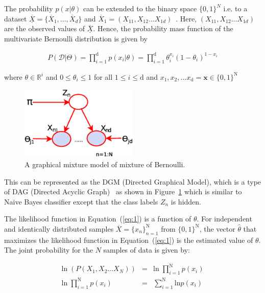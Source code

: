 The probability $p(x|\theta)$ can be extended to the binary space $\{0,1\}^{N}$ i.e. to a dataset $\underline{\overline{X}}= \{ \overline{X}_1 ,\ldots , \overline{X}_d \}$ and $\overline{X}_1 = \left( X_{11}, X_{12} \ldots X_{1d}\right)$~\cite{bishop}. Here,  $\left( X_{11}, X_{12} \ldots X_{1d}\right)$ are the observed values of $\underline{\overline{{X}}}$. Hence, the probability mass function of the multivariate Bernoulli distribution is given by

\begin{eqnarray}
\label{eq:1}
P(\mathcal{D}|\Theta)=\displaystyle\prod_{i=1}^{\mathrm{d}}p(x_i|\theta) = \displaystyle\prod_{i=1}^{\mathrm{d}} \theta_i ^{x_i}(1-\theta _i)^{1-x_i}
\end{eqnarray} 

where $\theta \in \mathbb{R}^i$ and $0 \leq \theta _i \leq 1$ for all $1 \leq i \leq \mathrm{d}$ and $x_1, x_2, \ldots x_\mathrm{d} = \mathbf{x} \in \{0,1\}^\mathrm{N}$

\begin{figure}[h!]
\centering
\includegraphics[width=0.5\textwidth]{figures/bmm}
\caption{A graphical mixture model of mixture of Bernoulli.}\label{Fig:bmm}
\end{figure}

This can be represented as the DGM (Directed Graphical Model), which is a type of DAG (Directed Acyclic Graph)~\cite{bishop} as shown in Figure~\ref{Fig:bmm} which is similar to Naive Bayes classifier except that the class labels $Z_n$ is hidden.

The likelihood function in Equation~(\ref{eq:1}) is a function of $\theta$. For independent and identically distributed samples $\overline{{X}}=\{x_n\} ^{\mathrm{N}}_{n=1}$ from $\{ 0, 1\}^{\mathrm{N}}$, the vector $\hat{\theta}$ that maximizes the likelihood function in Equation~(\ref{eq:1}) is the estimated value of $\theta$. The joint probability for the $N$ samples of data is given by:

\begin{eqnarray}
\label{eq:0}
\mathrm{ln} \; (P(X_1, X_2 \ldots X_N)) & = & \mathrm{ln} \; \displaystyle\prod_{i=1}^{\mathrm{N}} p(x_i) \nonumber \\
\mathrm{ln} \;\displaystyle\prod_{i=1}^{\mathrm{N}} p(x_i) & = & \displaystyle\sum_{i=1}^{\mathrm{N}} \mathrm{ln} p(x_i) 
\end{eqnarray}

